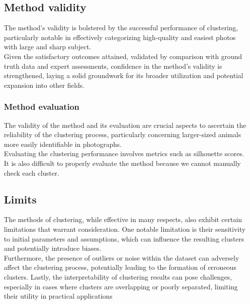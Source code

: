 \documentclass[12pt,a4paper,twoside]{article}
\begin{document}
\subsection{Method validity}
The method's validity is bolstered by the successful performance of clustering, particularly notable in effectively categorizing high-quality and easiest photos with large and sharp subject.\\
Given the satisfactory outcomes attained, validated by comparison with ground truth data and expert assessments, confidence in the method's validity is strengthened, laying a solid groundwork for its broader utilization and potential expansion into other fields.
\subsubsection{Method evaluation}
The validity of the method and its evaluation are crucial aspects to ascertain the reliability of the clustering process, particularly concerning larger-sized animals more easily identifiable in photographs.\\
Evaluating the clustering performance involves metrics such as silhouette scores.\\ It is also difficult to properly evaluate the method because we cannot manually check each cluster.

\subsection{Limits}
The methods of clustering, while effective in many respects, also exhibit certain limitations that warrant consideration. One notable limitation is their sensitivity to initial parameters and assumptions, which can influence the resulting clusters and potentially introduce biases.\\
Furthermore, the presence of outliers or noise within the dataset can adversely affect the clustering process, potentially leading to the formation of erroneous clusters. Lastly, the interpretability of clustering results can pose challenges, especially in cases where clusters are overlapping or poorly separated, limiting their utility in practical applications
\end{document}
